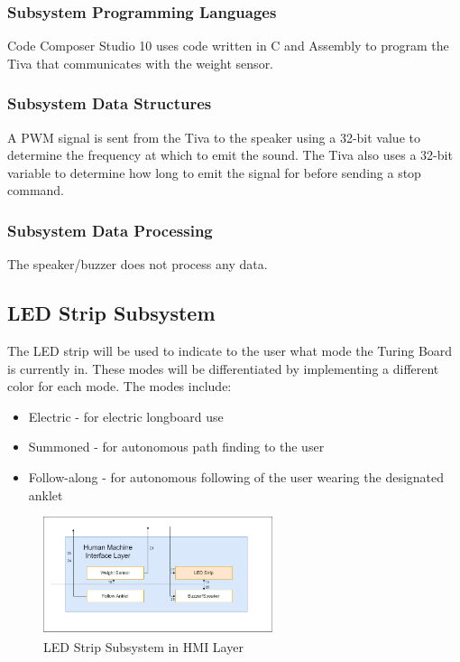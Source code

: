 \subsubsection{Subsystem Programming Languages}
Code Composer Studio 10 uses code written in C and Assembly to program the Tiva that communicates with the weight sensor.

\subsubsection{Subsystem Data Structures}
A PWM signal is sent from the Tiva to the speaker using a 32-bit value to determine the frequency at which to emit the sound. The Tiva also uses a 32-bit variable to determine how long to emit the signal for before sending a stop command.

\subsubsection{Subsystem Data Processing}
The speaker/buzzer does not process any data.

\subsection{LED Strip Subsystem}
The LED strip will be used to indicate to the user what mode the Turing Board is currently in. These modes will be differentiated by implementing a different color for each mode. The modes include:
\begin{itemize}
    \item Electric - for electric longboard use
    \item Summoned - for autonomous path finding to the user
    \item Follow-along - for autonomous following of the user wearing the designated
    anklet
\end{itemize}

\begin{figure}[h!]
	\centering
 	\includegraphics[width=0.60\textwidth]{images/Kendall/LED Strip.png}
 \caption{LED Strip Subsystem in HMI Layer}
\end{figure}

